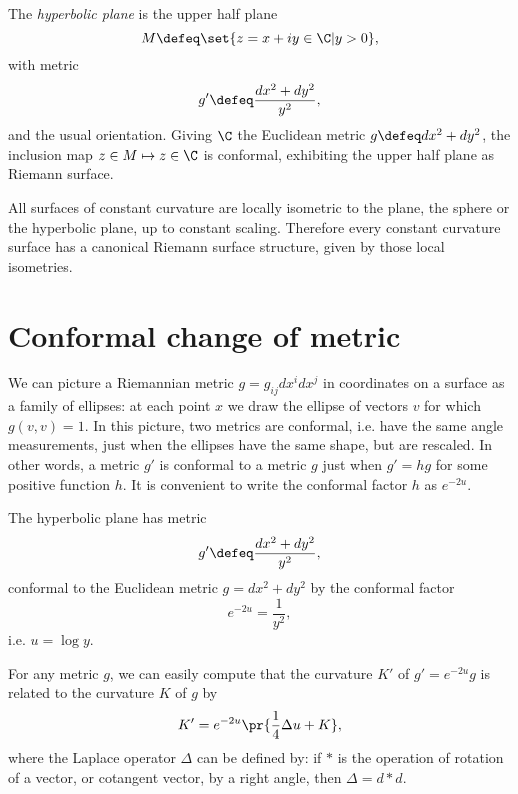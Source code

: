 \begin{example}
The \emph{hyperbolic plane} is the upper half plane
\[
M\defeq\set{z=x+iy \in \C|y > 0},
\]
with metric
\[
g'\defeq \frac{dx^2+dy^2}{y^2},
\]
and the usual orientation.
Giving \(\C\) the Euclidean metric \(g\defeq dx^2+dy^2\), the inclusion map \(z \in M \mapsto z \in \C\) is conformal, exhibiting the upper half plane as Riemann surface.
\end{example}
\begin{example}
All surfaces of constant curvature are locally isometric to the plane, the sphere or the hyperbolic plane, up to constant scaling.
Therefore every constant curvature surface has a canonical Riemann surface structure, given by those local isometries.
\end{example}


\section{Conformal change of metric}
We can picture a Riemannian metric \(g=g_{ij} dx^i dx^j\) in coordinates on a surface as a family of ellipses: at each point \(x\) we draw the ellipse of vectors \(v\) for which \(g(v,v)=1\).
In this picture, two metrics are conformal, i.e. have the same angle measurements, just when the ellipses have the same shape, but are rescaled.
In other words, a metric \(g'\) is conformal to a metric \(g\) just when \(g'=h g\) for some positive function \(h\).
It is convenient to write the conformal factor \(h\) as \(e^{-2u}\).
\begin{example}
The hyperbolic plane has metric
\[
g'\defeq \frac{dx^2+dy^2}{y^2},
\]
conformal to the Euclidean metric \(g=dx^2+dy^2\) by the conformal factor 
\[
e^{-2u}=\frac{1}{y^2},
\]
i.e. \(u = \log y\).
\end{example}
For any metric \(g\), we can easily compute that the curvature \(K'\) of \(g'=e^{-2u}g\) is related to the curvature \(K\) of \(g\) by
\[
K'=e^{-2u}\pr{\frac{1}{4} \Delta u + K},
\]
where the Laplace operator \(\Delta\) can be defined by: if \(*\) is the operation of rotation of a vector, or cotangent vector, by a right angle, then \(\Delta=d*d\).

